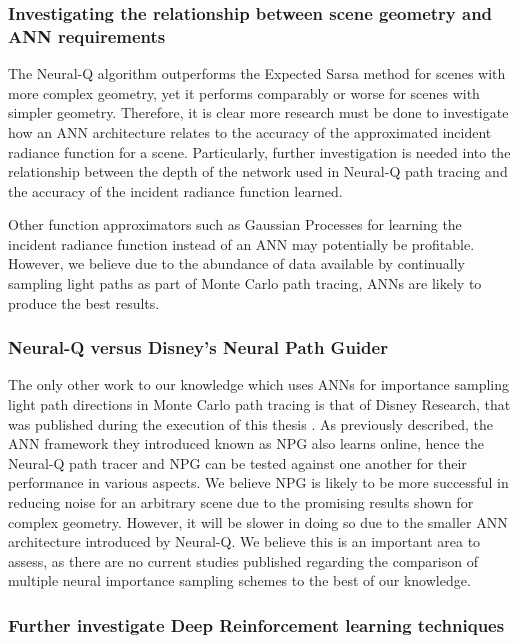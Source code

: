 \documentclass[../dissertation.tex]{subfiles}
\begin{document}
\subsubsection{Investigating the relationship between scene geometry and ANN requirements}

The Neural-Q algorithm outperforms the Expected Sarsa method for scenes with more complex geometry, yet it performs comparably or worse for scenes with simpler geometry. Therefore, it is clear more research must be done to investigate how an ANN architecture relates to the accuracy of the approximated incident radiance function for a scene. Particularly, further investigation is needed into the relationship between the depth of the network used in Neural-Q path tracing and the accuracy of the incident radiance function learned.

Other function approximators such as Gaussian Processes \cite{bishop2006pattern} for learning the incident radiance function instead of an ANN may potentially be profitable. However, we believe due to the abundance of data available by continually sampling light paths as part of Monte Carlo path tracing, ANNs are likely to produce the best results. 

\subsubsection{Neural-Q versus Disney's Neural Path Guider}

The only other work to our knowledge which uses ANNs for importance sampling light path directions in Monte Carlo path tracing is that of Disney Research, that was published during the execution of this thesis \cite{muller2018neural}. As previously described, the ANN framework they introduced known as NPG also learns online, hence the Neural-Q path tracer and NPG can be tested against one another for their performance in various aspects. We believe NPG is likely to be more successful in reducing noise for an arbitrary scene due to the promising results shown for complex geometry. However, it will be slower in doing so due to the smaller ANN architecture introduced by Neural-Q. We believe this is an important area to assess, as there are no current studies published regarding the comparison of multiple neural importance sampling schemes to the best of our knowledge.

\subsubsection{Further investigate Deep Reinforcement learning techniques}
\end{document}
